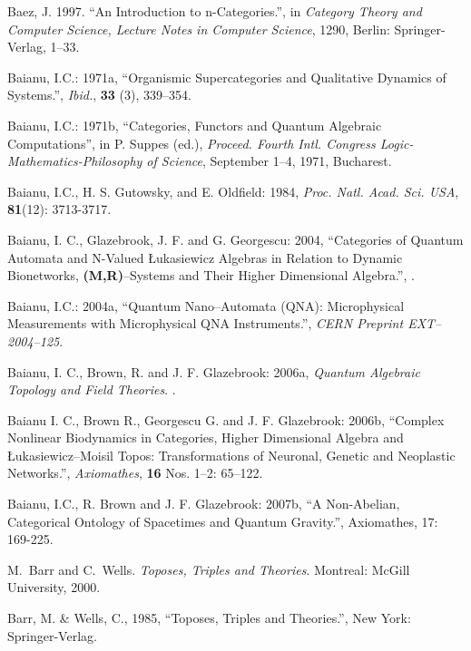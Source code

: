 \documentclass[12pt]{article}
\theoremstyle{plain}
\theoremstyle{definition}
\numberwithin{equation}{section}
\begin{document}
\begin{thebibliography}{99}
Baez, J. 1997. ``An Introduction to n-Categories.'', in \emph{Category Theory and Computer Science, Lecture Notes in Computer Science}, 1290, Berlin: Springer-Verlag, 1--33. 

Baianu, I.C.: 1971a, ``Organismic Supercategories and Qualitative Dynamics of Systems.'', \emph{Ibid.}, \textbf{33} (3), 339--354.
 
Baianu, I.C.: 1971b, ``Categories, Functors and Quantum Algebraic Computations'', in P. Suppes (ed.), \emph{Proceed. Fourth Intl. Congress Logic-Mathematics-Philosophy of Science}, September 1--4, 1971, Bucharest.

Baianu, I.C., H. S. Gutowsky, and E. Oldfield: 1984, {\em Proc. Natl. Acad. Sci. USA}, \textbf{81}(12):
3713-3717.
 
Baianu, I. C., Glazebrook, J. F. and G. Georgescu: 2004, ``Categories of Quantum Automata and N-Valued \L ukasiewicz Algebras in Relation to Dynamic Bionetworks, \textbf{(M,R)}--Systems and Their Higher Dimensional Algebra.'', 
.

Baianu, I.C.: 2004a, ``Quantum Nano--Automata (QNA): Microphysical Measurements with Microphysical QNA Instruments.'', \emph{CERN Preprint EXT--2004--125}.

Baianu, I. C., Brown, R. and J. F. Glazebrook: 2006a, {\em Quantum Algebraic Topology and Field Theories}.  
. 

Baianu I. C., Brown R., Georgescu G. and J. F. Glazebrook: 2006b, ``Complex Nonlinear Biodynamics in Categories, Higher Dimensional Algebra and \L ukasiewicz--Moisil Topos: Transformations of Neuronal, Genetic and Neoplastic Networks.'', \emph{Axiomathes}, \textbf{16} Nos. 1--2: 65--122.

Baianu, I.C.,  R. Brown and J. F. Glazebrook: 2007b, ``A Non-Abelian, Categorical Ontology of Spacetimes and Quantum Gravity.'', Axiomathes, 17: 169-225.

M.~Barr and C.~Wells. {\em Toposes, Triples and Theories}. Montreal: McGill University, 2000.

Barr, M. \& Wells, C., 1985, ``Toposes, Triples and Theories.'', New York: Springer-Verlag.
 

\end{thebibliography}
\end{document}
